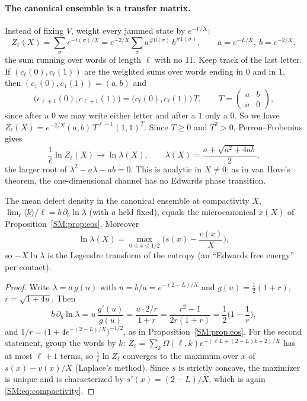 \paragraph{The canonical ensemble is a transfer matrix.} Instead of fixing $V$, weight every jammed
state by $e^{-V/X}$:
\[
  Z_\ell(X)=\sum_\sigma e^{-t(\sigma)/X}=e^{-2/X}\sum_\sigma a^{\#0(\sigma)}\,b^{\#1(\sigma)},\qquad a=e^{-L/X},\ b=e^{-2/X},
\]
the sum running over words of length $\ell$ with no $11$. Keep track of the last letter. If
$(c_\ell(0),c_\ell(1))$ are the weighted sums over words ending in $0$ and in $1$, then
$(c_1(0),c_1(1))=(a,b)$ and
\[
  \big(c_{\ell+1}(0),c_{\ell+1}(1)\big)=\big(c_\ell(0),c_\ell(1)\big)\,T,\qquad
  T=\begin{pmatrix}a&b\\a&0\end{pmatrix},
\]
since after a $0$ we may write either letter and after a $1$ only a $0$. So we have
$Z_\ell(X)=e^{-2/X}(a,b)\,T^{\ell-1}(1,1)^T$. Since $T\ge0$ and $T^2>0$, Perron--Frobenius gives
\[
  \frac1\ell\ln Z_\ell(X)\longrightarrow\ln\lambda(X),\qquad \lambda(X)=\frac{a+\sqrt{a^2+4ab}}2 ,
\]
the larger root of $\lambda^2-a\lambda-ab=0$. This is analytic in $X\ne0$: as in van Hove's theorem, the
one-dimensional channel has no Edwards phase transition.

\begin{proposition}\label{SM:prop:canon}
The mean defect density in the canonical ensemble at compactivity $X$,
$\lim_\ell\langle k\rangle/\ell=b\,\partial_b\ln\lambda$ (with $a$ held fixed), equals the microcanonical
$x(X)$ of Proposition~\ref{SM:prop:eos}. Moreover
\[
  \ln\lambda(X)=\max_{0\le x\le1/2}\Big(s(x)-\frac{v(x)}X\Big),
\]
so $-X\ln\lambda$ is the Legendre transform of the entropy (an ``Edwards free energy'' per contact).
\end{proposition}

\begin{proof}
Write $\lambda=a\,g(u)$ with $u=b/a=e^{-(2-L)/X}$ and $g(u)=\frac12(1+r)$, $r=\sqrt{1+4u}$. Then
\[
  b\,\partial_b\ln\lambda=u\,\frac{g'(u)}{g(u)}=\frac{u\cdot 2/r}{1+r}=\frac{r^2-1}{2r(1+r)}=\frac12\Big(1-\frac1r\Big),
\]
and $1/r=\big(1+4e^{-(2-L)/X}\big)^{-1/2}$, as in Proposition~\ref{SM:prop:eos}. For the second statement,
group the words by $k$: $Z_\ell=\sum_k\Omega(\ell,k)e^{-(\ell L+(2-L)k+2)/X}$ has at most $\ell+1$ terms, so
$\frac1\ell\ln Z_\ell$ converges to the maximum over $x$ of $s(x)-v(x)/X$ (Laplace's method). Since $s$ is strictly concave, the
maximizer is unique and is characterized by $s'(x)=(2-L)/X$, which is again \eqref{SM:eq:compactivity}.
\end{proof}


